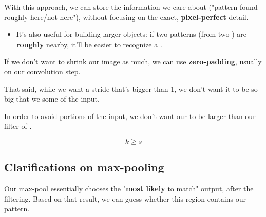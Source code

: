         With this approach, we can store the information we care about ("pattern found roughly here/not here"), without focusing on the exact, \textbf{pixel-perfect} detail.

        \begin{itemize}
            \item It's also useful for building larger objects: if two patterns (from two ) are \textbf{roughly} nearby, it'll be easier to recognize a .
        \end{itemize}

        If we don't want to shrink our image as much, we can use \textbf{zero-padding}, usually on our convolution step.

        \subsecdiv

        That said, while we want a stride that's bigger than 1, we don't want it to be so big that we  some of the input.\\

        \begin{kequation}
            In order to avoid  portions of the input, we don't want our  to be larger than our filter of .

            \begin{equation*}
                k \geq s
            \end{equation*}
        \end{kequation}

    \pagebreak
    \subsection{Clarifications on max-pooling}

        Our max-pool essentially chooses the "\textbf{most likely} to match" output, after the filtering. Based on that result, we can guess whether this region contains our pattern.\\

